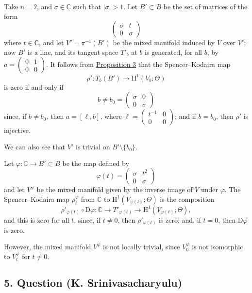 \documentclass[british]{article}
\newcommand{\oldpage}[1]{\marginpar{\footnotesize$\Big\vert$ \textit{p.~#1}}}
\begin{document}
Take \(n=2\), and \(\sigma\in\mathbb{C}\) such that \(|\sigma|>1\). Let
\(B'\subset B\) be the set of matrices of the form \[
  \begin{pmatrix}
    \sigma & t
  \\0 & \sigma
  \end{pmatrix}
\] where \(t\in\mathbb{C}\), and let \(V'=\pi^{-1}(B')\) be the mixed
manifold induced by \(V\) over \(V'\); now \(B'\) is a line, and its
tangent space \(T'_b\) at \(b\) is generated, for all \(b\), by
\(a=\begin{pmatrix}0&1\\0&0\end{pmatrix}\). It follows from
\hyperref[three-proposition-3]{Proposition 3} that the Spencer--Kodaira
map \[
  \rho'\colon T_b(B') \to \mathrm{H}^1(V_b;\Theta)
\] is zero if and only if \[
  b \neq b_0 =
  \begin{pmatrix}
    \sigma & 0
  \\0 & \sigma
  \end{pmatrix}
\] since, if \(b\neq b_0\), then \(a=[\ell,b]\), where
\(\ell=\begin{pmatrix}t^{-1}&0\\0&0\end{pmatrix}\); and if \(b=b_0\),
then \(\rho'\) is injective.

We can also see that \(V'\) is trivial on \(B'\setminus\{b_0\}\).

Let \(\varphi\colon\mathbb{C}\to B'\subset B\) be the map defined by \[
  \varphi(t) =
  \begin{pmatrix}
    \sigma & t^2
  \\0 & \sigma
  \end{pmatrix}
\] and let \(V^\varphi\) be the mixed manifold given by the inverse
image of \(V\) under \(\varphi\). The Spencer--Kodaira map
\(\rho_t^\varphi\) from \(\mathbb{C}\) to
\(\mathrm{H}^1(V_{\varphi(t)};\Theta)\) is the composition
\oldpage{3-08} \[
  \rho'_{\varphi(t)}\circ\mathrm{D}\varphi\colon
  \mathbb{C}
  \to T'_{\varphi(t)}
  \to \mathrm{H}^1(V_{\varphi(t)};\Theta),
\] and this is zero for all \(t\), since, if \(t\neq0\), then
\(\rho'_{\varphi(t)}\) is zero; and, if \(t=0\), then
\(\mathrm{D}\varphi\) is zero.

However, the mixed manifold \(V^\varphi\) is not locally trivial, since
\(V_0^\varphi\) is not isomorphic to \(V_t^\varphi\) for \(t\neq0\).

\subsection*{5. Question (K.
Srinivasacharyulu)}\label{three-section-III.5}
\end{document}
